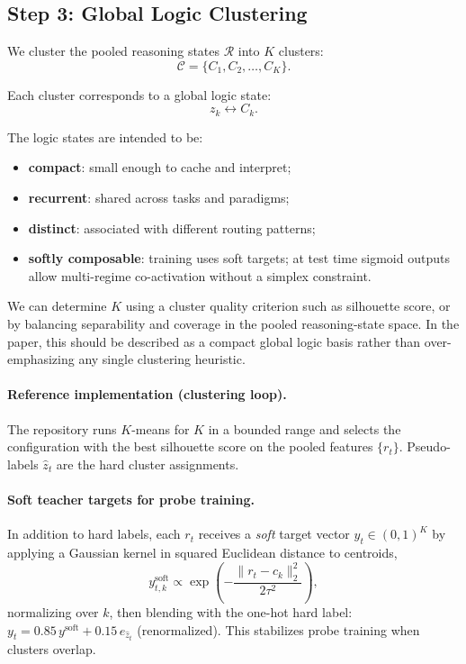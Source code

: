 \documentclass[11pt]{article}
\begin{document}
\subsection{Step 3: Global Logic Clustering}

We cluster the pooled reasoning states $\mathcal{R}$ into $K$ clusters:
\[
\mathcal{C} = \{C_1,C_2,\dots,C_K\}.
\]

Each cluster corresponds to a global logic state:
\[
z_k \leftrightarrow C_k.
\]

The logic states are intended to be:
\begin{itemize}[leftmargin=1.5em]
    \item \textbf{compact}: small enough to cache and interpret;
    \item \textbf{recurrent}: shared across tasks and paradigms;
    \item \textbf{distinct}: associated with different routing patterns;
    \item \textbf{softly composable}: training uses soft targets; at test time sigmoid outputs allow multi-regime co-activation without a simplex constraint.
\end{itemize}

We can determine $K$ using a cluster quality criterion such as silhouette score, or by balancing separability and coverage in the pooled reasoning-state space. In the paper, this should be described as a compact global logic basis rather than over-emphasizing any single clustering heuristic.

\paragraph{Reference implementation (clustering loop).}
The repository runs $K$-means for $K$ in a bounded range and selects the configuration with the best silhouette score on the pooled features $\{r_t\}$. Pseudo-labels $\hat{z}_t$ are the hard cluster assignments.

\paragraph{Soft teacher targets for probe training.}
In addition to hard labels, each $r_t$ receives a \emph{soft} target vector $y_t\in(0,1)^K$ by applying a Gaussian kernel in squared Euclidean distance to centroids,
\[
y^{\text{soft}}_{t,k} \propto \exp\!\left(-\frac{\|r_t-c_k\|_2^2}{2\tau^2}\right),
\]
normalizing over $k$, then blending with the one-hot hard label: $y_t = 0.85\, y^{\text{soft}} + 0.15\, e_{\hat{z}_t}$ (renormalized). This stabilizes probe training when clusters overlap.
\end{document}
